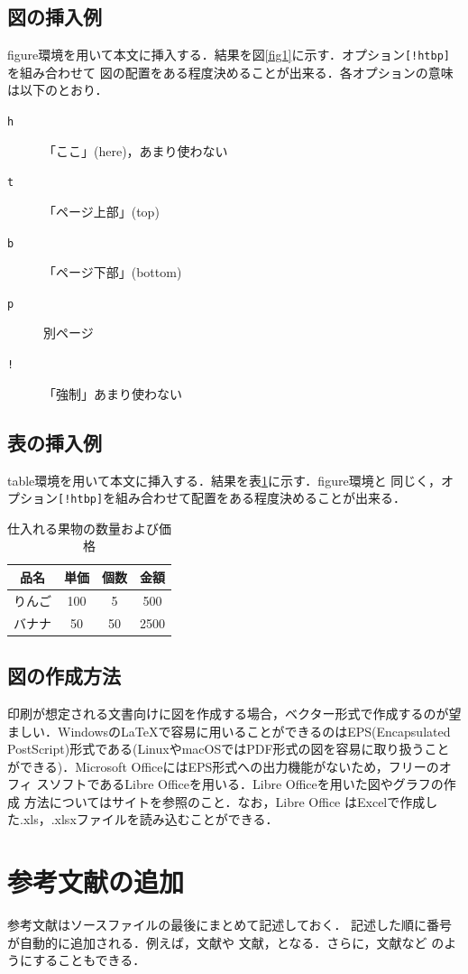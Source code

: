 \documentclass[uplatex,a4paper,9pt]{bxjsarticle}
\begin{document}
\subsection{図の挿入例}
figure環境を用いて本文に挿入する．結果を図\ref{fig1}に示す．オプション\verb|[!htbp]|を組み合わせて
図の配置をある程度決めることが出来る．各オプションの意味は以下のとおり．
\begin{description}
\item[\tt h] 「ここ」(here)，あまり使わない
\item[\tt t] 「ページ上部」(top)
\item[\tt b] 「ページ下部」(bottom)
\item[\tt p]  別ページ
\item[\tt !] 「強制」あまり使わない
\end{description}
\subsection{表の挿入例}
table環境を用いて本文に挿入する．結果を表\ref{tab1}に示す．figure環境と
同じく，オプション\verb|[!htbp]|を組み合わせて配置をある程度決めることが出来る．
\begin{table}[tb]
\centering
\caption{仕入れる果物の数量および価格}
\label{tab1}
{\small
\begin{tabular}{c|c|c|c}\hline
品名 & 単価 & 個数 & 金額 \\ \hline\hline
りんご & 100 & 5 & 500 \\ \hline
バナナ & 50 & 50 & 2500 \\ \hline
\end{tabular}
}
\end{table}
\subsection{図の作成方法}
印刷が想定される文書向けに図を作成する場合，ベクター形式で作成するのが望
ましい．Windowsの\LaTeX で容易に用いることができるのはEPS(Encapsulated
PostScript)形式である(LinuxやmacOSではPDF形式の図を容易に取り扱うことができる)．Microsoft OfficeにはEPS形式への出力機能がないため，フリーのオフィ
スソフトであるLibre Officeを用いる．Libre Officeを用いた図やグラフの作成
方法についてはサイト\cite{labEditorTips}を参照のこと．なお，Libre Office
はExcelで作成した.xls，.xlsxファイルを読み込むことができる．
\section{参考文献の追加}
参考文献はソースファイルの最後にまとめて記述しておく．
記述した順に番号が自動的に追加される．例えば，文献\cite{BrainBook}や
文献\cite{EBCOTpaper}，となる．さらに，文献\cite{BrainBook, EBCOTpaper}など
のようにすることもできる．
\end{document}
